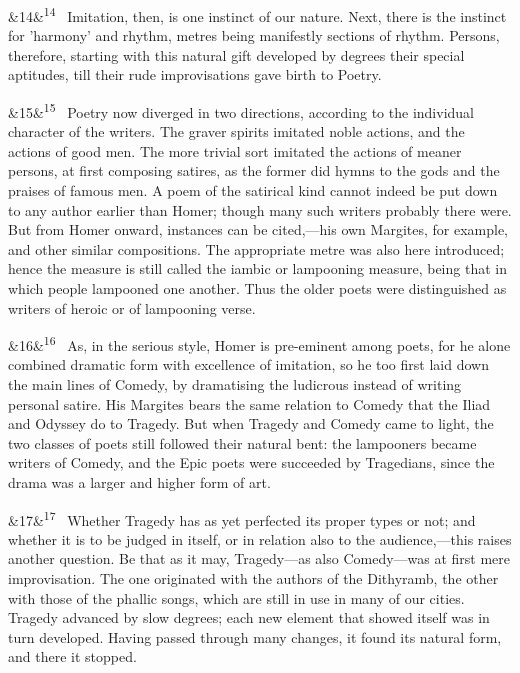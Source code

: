 \documentclass[12pt]{article}
\newcommand{\para}[1][]{\par\noindent\ifx&#1&\else\textsuperscript{\footnotesize #1}~\fi}
\begin{document}
\para[14] Imitation, then, is one instinct of our nature. Next, there is the instinct for 'harmony' and rhythm, metres being manifestly sections of rhythm. Persons, therefore, starting with this natural gift developed by degrees their special aptitudes, till their rude improvisations gave birth to Poetry.

\para[15] Poetry now diverged in two directions, according to the individual character of the writers. The graver spirits imitated noble actions, and the actions of good men. The more trivial sort imitated the actions of meaner persons, at first composing satires, as the former did hymns to the gods and the praises of famous men. A poem of the satirical kind cannot indeed be put down to any author earlier than Homer; though many such writers probably there were. But from Homer onward, instances can be cited,---his own Margites, for example, and other similar compositions. The appropriate metre was also here introduced; hence the measure is still called the iambic or lampooning measure, being that in which people lampooned one another. Thus the older poets were distinguished as writers of heroic or of lampooning verse.

\para[16] As, in the serious style, Homer is pre-eminent among poets, for he alone combined dramatic form with excellence of imitation, so he too first laid down the main lines of Comedy, by dramatising the ludicrous instead of writing personal satire. His Margites bears the same relation to Comedy that the Iliad and Odyssey do to Tragedy. But when Tragedy and Comedy came to light, the two classes of poets still followed their natural bent: the lampooners became writers of Comedy, and the Epic poets were succeeded by Tragedians, since the drama was a larger and higher form of art.

\para[17] Whether Tragedy has as yet perfected its proper types or not; and whether it is to be judged in itself, or in relation also to the audience,---this raises another question. Be that as it may, Tragedy---as also Comedy---was at first mere improvisation. The one originated with the authors of the Dithyramb, the other with those of the phallic songs, which are still in use in many of our cities. Tragedy advanced by slow degrees; each new element that showed itself was in turn developed. Having passed through many changes, it found its natural form, and there it stopped.
\end{document}
